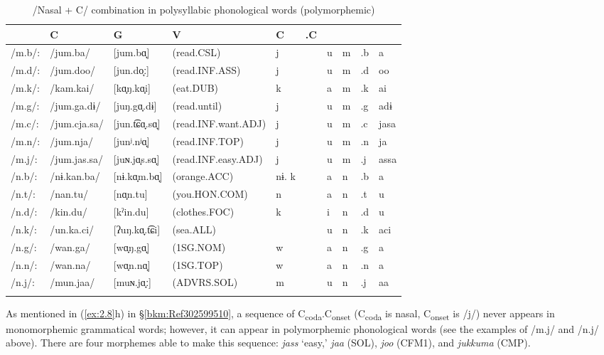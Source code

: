 \begin{table}\footnotesize
\caption{/Nasal + C/ combination in polysyllabic phonological words (polymorphemic)}
\begin{tabular}{ *{10}{l} }
\lsptoprule
 \multicolumn{4}{l}{} &  {C} & {G} & {V} & {C} & {.C} & {}\\\midrule
{/m.b/:} & {/jum.ba/}     & [jum.bɑ̟]      &  {(read.CSL)}          &   j   & &  u & m & .b &a\\
{/m.d/:} & {/jum.doo/}    & [jun.do̞ː]     &  {(read.INF.ASS)}      &   j   & &  u & m & .d &oo\\
{/m.k/:} & {/kam.kai/}    & [kɑ̟ŋ.kɑ̟i]    &   {(eat.DUB)}          &    k  & &   a&  m&  .k& ai\\
{/m.g/:} & {/jum.ga.dɨ/}  & [juŋ.gɑ̟.dɨ]   &  {(read.until)}        &   j   & &  u & m & .g &adɨ\\
{/m.c/:} & {/jum.cja.sa/} & [jun.t͡ɕɑ̟.sɑ̟]&   {(read.INF.want.ADJ)}&    j  &  &   u&  m&  .c& jasa\\
{/m.n/:} & {/jum.nja/}    & [junʲ.nʲɑ̟]    &  {(read.INF.TOP)}      &   j   & &  u & m & .n &ja\\
{/m.j/:} & {/jum.jas.sa/} & [juɴ.jɑ̟s.sɑ̟] &   {(read.INF.easy.ADJ)}&    j  & &   u&  m&  .j& assa\\
{/n.b/:} & {/nɨ.kan.ba/}  & [nɨ.kɑ̟m.bɑ̟]  &   {(orange.ACC)}       &    nɨ.   k  & &  a & n & .b & a\\
{/n.t/:} & {/nan.tu/}     & [nɑ̟n.tu]      &  {(you.HON.COM)}       &   n &   &  a  &  n& .t& u\\
{/n.d/:} & {/kin.du/}     & [kˀin.du]      & {(clothes.FOC)}        &  k &   & i   & n &.d &u\\
{/n.k/:} & {/un.ka.ci/}   & [ʔuŋ.kɑ̟.t͡ɕi] &  {(sea.ALL)}           & & &   u   &  n  &  .k & aci\\
{/n.g/:} & {/wan.ga/}     & [wɑ̟ŋ.gɑ̟]     &   {(1SG.NOM)}          &    w  & &   a &    n & .g & a\\
{/n.n/:} & {/wan.na/}     & [wɑ̟n.nɑ̟]     &   {(1SG.TOP)}          &    w  & &   a &   n & .n & a\\
{/n.j/:} & {/mun.jaa/}    & [muɴ.jɑ̟ː]     &  {(ADVRS.SOL)}         &   m   & &  u  &  n & .j & aa\\
\lspbottomrule
\end{tabular}
\end{table}

As mentioned in (\ref{ex:2.8}h) in §\ref{bkm:Ref302599510}, a sequence of C\textsubscript{coda}.C\textsubscript{onset} (C\textsubscript{coda} is nasal, C\textsubscript{onset} is /j/) never appears in monomorphemic grammatical words; however, it can appear in polymorphemic phonological words (see the examples of /m.j/ and /n.j/ above). There are four morphemes able to make this sequence: \textit{jass} ‘easy,’ \textit{jaa} (SOL), \textit{joo} (CFM1), and \textit{jukkuma} (CMP).

